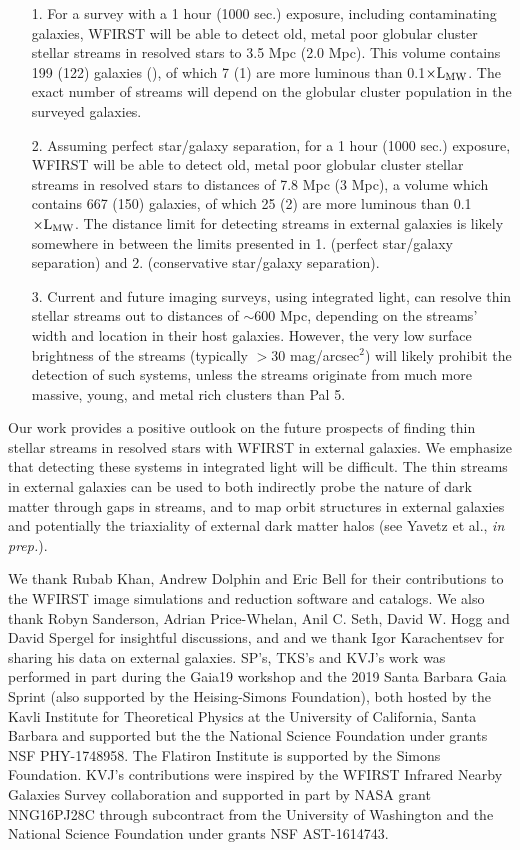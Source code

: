 \documentclass[twocolumn]{aastex62}
\begin{document}
\begin{itemize}
\item[1.]  For a survey with a 1 hour (1000 sec.) exposure, including contaminating galaxies, WFIRST will be able to detect old, metal poor globular cluster stellar streams in resolved stars to 3.5 Mpc (2.0 Mpc). This volume contains 199 (122) galaxies (\citealt{kara19}), of which 7 (1) are more luminous than 0.1$\times {\rm L}_{\rm MW}$. The exact number of streams will depend on the globular cluster population in the surveyed galaxies.
\item[2.] Assuming perfect star/galaxy separation, for a 1 hour (1000 sec.) exposure, WFIRST will be able to detect old, metal poor globular cluster stellar streams in resolved stars to distances of 7.8 Mpc (3 Mpc), a volume which contains 667 (150) galaxies, of which 25 (2) are more luminous than 0.1$\times {\rm L}_{\rm MW}$. 
The distance limit for detecting streams in external galaxies is likely somewhere in between the limits presented in 1. (perfect star/galaxy separation) and 2. (conservative star/galaxy separation).
\item[3.]  Current and future imaging surveys, using integrated light, can resolve thin stellar streams out to distances of $\sim$600 Mpc, depending on the streams' width and location in their host galaxies. However, the very low surface brightness of the streams (typically $>$30 mag/arcsec$^{2}$) will likely prohibit the detection of such systems, unless the streams originate from much more massive, young, and metal rich clusters than Pal 5. 
\end{itemize}

Our work provides a positive outlook on the future prospects of finding thin stellar streams in resolved stars with WFIRST in external galaxies. We emphasize that detecting these systems in integrated light will be difficult. The thin streams in external galaxies can be used to both indirectly probe the nature of dark matter through gaps in streams, and to map orbit structures in external galaxies and potentially the triaxiality of external dark matter halos (see Yavetz et al., {\it in prep.}). 

\acknowledgements
We thank Rubab Khan, Andrew Dolphin and Eric Bell for their contributions to the WFIRST image simulations and reduction software and catalogs. We also thank Robyn Sanderson, Adrian Price-Whelan, Anil C. Seth, David W. Hogg and David Spergel for insightful discussions, and and we thank Igor Karachentsev for sharing his data on external galaxies. SP's, TKS's and KVJ's work was performed in part during the Gaia19 workshop and the 2019 Santa Barbara Gaia Sprint (also supported by the Heising-Simons Foundation), both hosted by the Kavli Institute for Theoretical Physics at the University of California, Santa Barbara and supported but the the National Science Foundation under grants NSF PHY-1748958. The Flatiron Institute is supported by the Simons Foundation. KVJ’s contributions were inspired by the WFIRST Infrared Nearby Galaxies Survey  collaboration and supported in part by NASA grant NNG16PJ28C through subcontract from the University of Washington and the National Science Foundation under grants NSF AST-1614743. 
\end{document}
